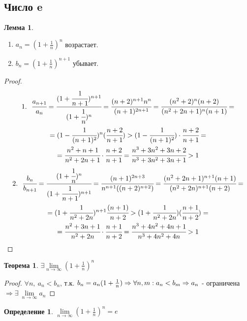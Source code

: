 \documentclass[a4paper, 12pt]{article}
\newcommand\tab[1][.5cm]{\hspace*{#1}}
\newcommand{\lims}{\lim\limits_{n\to \infty}}
\theoremstyle{definition}
\newtheorem*{definition}{Определение}
\newtheorem*{theorem}{Теорема}
\newtheorem*{lemma}{Лемма}
\begin{document}
    \subsection{Число e}
        \begin{lemma} \tab
            \begin{enumerate}
                \item $a_n=(1+\frac{1}{n})^n$ возрастает.
                \item $b_n=(1+\frac{1}{n})^{n+1}$ убывает.
            \end{enumerate}
        \end{lemma} 
        \begin{proof}
            \begin{multline*}
                1.\ \ \cfrac{a_{n+1}}{a_n}=\cfrac{(1+\cfrac{1}{n+1})^{n+1}}{(1+\cfrac{1}{n})^{n}}=\cfrac{(n+2)^{n+1}n^n}{(n+1)^{2n+1}}=\cfrac{(n^2+2)^n (n+2)}{(n^2+2n+1)^n (n+1)}=\\=(1-\cfrac{1}{(n+1)^2})^n (\cfrac{n+2}{n+1})>(1-\cfrac{1}{(n+1)^2})\cdot \cfrac{n+2}{n+1}=\\=\cfrac{n^2+n+1}{n^2+2n+1}\cdot \cfrac{n+2}{n+1}=\cfrac{n^3+3n^2+3n+2}{n^3+3n^2+3n+1}>1
            \end{multline*}
            \begin{multline*}
                2.\ \ \cfrac{b_n}{b_{n+1}}=\cfrac{(1+\cfrac{1}{n})^{n}}{(1+\cfrac{1}{n+1})^{n+1}}=\cfrac{(n+1)^{2n+3}}{n^{n+1}((n+2)^{n+2})}=\cfrac{(n^2+2n+1)^{n+1}(n+1)}{(n^2+2n)^{n+1}(n+2)}=\\=(1+\cfrac{1}{n^2+2n})^{n+1}\cfrac{(n+1)}{n+2}>(1+\cfrac{1}{n^2+2n})(\cfrac{n+1}{n+2})=\\=\cfrac{n^2+3n+1}{n^2+2n}\cdot \cfrac{n+1}{n+2}=\cfrac{n^3+4n^2+4n+1}{n^3+4n^2+4n}>1
            \end{multline*}
        \end{proof} 
        \begin{theorem}
            $\exists \lims (1+\frac{1}{n})^n$
        \end{theorem} 
        \begin{proof}
            $\forall n,\ a_n<b_n$, т.к. $b_n=a_n(1+\frac{1}{n})\Rightarrow \forall n,m: a_n<b_m\\
            \Rightarrow a_n$ - ограничена $\Rightarrow \exists\ \lims a_n$
        \end{proof} 
        \begin{definition}
            $\lims (1+\frac{1}{n})^n=e$
        \end{definition} 
\end{document}
